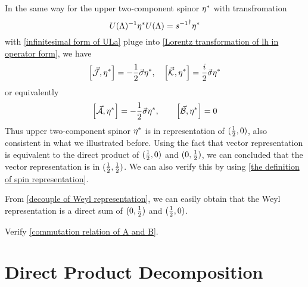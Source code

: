 In the same way for the upper two-component spinor ${\eta^*}$ with transfromation
\begin{equation} \label{Lorentz transformation of lh in operator form}
U(\Lambda)^{-1}{\eta^*} U(\Lambda) = {s^{-1}}^{\dagger} {\eta^*}
\end{equation}
with \eqref{infinitesimal form of ULa} pluge into \eqref{Lorentz transformation of lh in operator form}, we have
\begin{equation}
  \comm{\vec{\mathcal{J}}}{\lh}=-\half\vec{\s}\lh,\quad
\comm{\vec{\mathcal{K}}}{\lh} = \frac{i}{2}\vec{\s}\lh
\end{equation}
or equivalently
\begin{equation}
  \comm{\vec{\mathcal{A}}}{\lh} = -\half \vec{\s}\lh,\qquad
\comm{\vec{\mathcal{B}}}{\lh} =0
\end{equation}
Thus upper two-component spinor ${\eta^*}$ is in representation of $(\frac{1}{2},0)$, also consistent in what we illustrated before.
Using the fact that vector representation is equivalent to the direct product of $(\frac{1}{2},0)$ and $(0,\frac{1}{2})$, we can concluded that the vector representation is in $(\frac{1}{2},\frac{1}{2})$. We can also verify this by using \eqref{the definition of spin representation}.

From \eqref{decouple of Weyl representation}, we can easily obtain that the Weyl representation is a direct sum of $(0,\frac{1}{2})$ and $(\frac{1}{2},0)$. 


\begin{Exe}
Verify \eqref{commutation relation of A and B}.
\end{Exe}

\section{Direct Product Decomposition}

